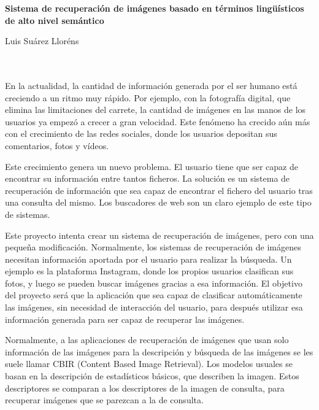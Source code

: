 
\cleardoublepage
\thispagestyle{empty}

\begin{center}
{\large\bfseries Sistema de recuperación de imágenes basado en
términos lingüísticos de alto nivel semántico}\\
\end{center}
\begin{center}
Luis Suárez Lloréns\\
\end{center}

\\

\vspace{0.7cm}
\\

En la actualidad, la cantidad de información generada por el ser humano está creciendo a un ritmo muy rápido. Por ejemplo, con la fotografía digital, que elimina las limitaciones del carrete, la cantidad de imágenes en las manos de los usuarios ya empezó a crecer a gran velocidad. Este fenómeno ha crecido aún más con el crecimiento de las redes sociales, donde los usuarios depositan sus comentarios, fotos y vídeos.

Este crecimiento genera un nuevo problema. El usuario tiene que ser capaz de encontrar su información entre tantos ficheros. La solución es un sistema de recuperación de información que sea capaz de encontrar el fichero del usuario tras una consulta del mismo. Los buscadores de web son un claro ejemplo de este tipo de sistemas.

Este proyecto intenta crear un sistema de recuperación de imágenes, pero con una pequeña modificación. Normalmente, los sistemas de recuperación de imágenes necesitan información aportada por el usuario para realizar la búsqueda. Un ejemplo es la plataforma Instagram, donde los propios usuarios clasifican sus fotos, y luego se pueden buscar imágenes gracias a esa información. El objetivo del proyecto será que la aplicación que sea capaz de clasificar automáticamente las imágenes, sin necesidad de interacción del usuario, para después utilizar esa información generada para ser capaz de recuperar las imágenes.

Normalmente, a las aplicaciones de recuperación de imágenes que usan solo información de las imágenes para la descripción y búsqueda de las imágenes se les suele llamar CBIR (Content Based Image Retrieval). Los modelos usuales se basan en la descripción de estadísticos básicos, que describen la imagen. Estos descriptores se comparan a los descriptores de la imagen de consulta, para recuperar imágenes que se parezcan a la de consulta.

